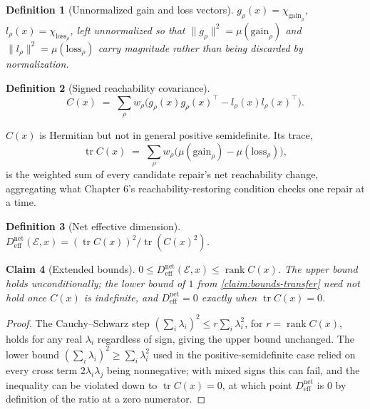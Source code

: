 \documentclass[12pt]{report}
\newtheorem{definition}{Definition}[section]
\newtheorem{claim}[definition]{Claim}
\begin{document}
\begin{definition}[Unnormalized gain and loss vectors]
$g_\rho(x) = \chi_{\mathrm{gain}_\rho}$, $l_\rho(x) =
\chi_{\mathrm{loss}_\rho}$, left unnormalized so that $\|g_\rho\|^2 =
\mu(\mathrm{gain}_\rho)$ and $\|l_\rho\|^2 = \mu(\mathrm{loss}_\rho)$
carry magnitude rather than being discarded by normalization.
\end{definition}

\begin{definition}[Signed reachability covariance]
\label{def:signed-covariance}
\[
C(x) \;=\; \sum_\rho w_\rho \bigl( g_\rho(x)g_\rho(x)^\top -
l_\rho(x)l_\rho(x)^\top \bigr).
\]
\end{definition}

$C(x)$ is Hermitian but not in general positive semidefinite. Its trace,
\[
\operatorname{tr} C(x) \;=\; \sum_\rho w_\rho \bigl(
\mu(\mathrm{gain}_\rho) - \mu(\mathrm{loss}_\rho) \bigr),
\]
is the weighted sum of every candidate repair's net reachability
change, aggregating what Chapter 6's reachability-restoring condition
checks one repair at a time.

\begin{definition}[Net effective dimension]
\label{def:deff-net}
$D_{\mathrm{eff}}^{\mathrm{net}}(\mathcal{E},x) = (\operatorname{tr}
C(x))^2 / \operatorname{tr}(C(x)^2)$.
\end{definition}

\begin{claim}[Extended bounds]
\label{claim:deff-net-bounds}
$0 \leq D_{\mathrm{eff}}^{\mathrm{net}}(\mathcal{E},x) \leq
\operatorname{rank} C(x)$. The upper bound holds unconditionally; the
lower bound of $1$ from \cref{claim:bounds-transfer} need not hold once
$C(x)$ is indefinite, and $D_{\mathrm{eff}}^{\mathrm{net}} = 0$ exactly
when $\operatorname{tr} C(x) = 0$.
\end{claim}

\begin{proof}
The Cauchy--Schwarz step $(\sum_i \lambda_i)^2 \leq r \sum_i
\lambda_i^2$, for $r = \operatorname{rank} C(x)$, holds for any real
$\lambda_i$ regardless of sign, giving the upper bound unchanged. The
lower bound $(\sum_i \lambda_i)^2 \geq \sum_i \lambda_i^2$ used in the
positive-semidefinite case relied on every cross term $2\lambda_i
\lambda_j$ being nonnegative; with mixed signs this can fail, and the
inequality can be violated down to $\operatorname{tr} C(x) = 0$, at
which point $D_{\mathrm{eff}}^{\mathrm{net}}$ is $0$ by definition of
the ratio at a zero numerator.
\end{proof}
\end{document}
